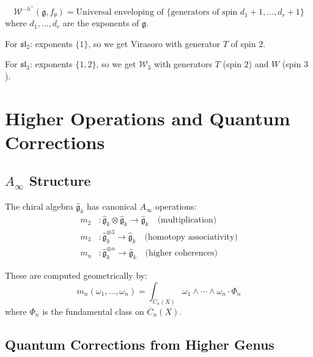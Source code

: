 \begin{theorem}
\begin{equation}
\mathcal{W}^{-h^\vee}(\mathfrak{g}, f_{\theta}) = \text{Universal enveloping of } \{\text{generators of spin } d_1+1, \ldots, d_r+1\}
\end{equation}
where $d_1, \ldots, d_r$ are the exponents of $\mathfrak{g}$.

For $\mathfrak{sl}_2$: exponents $\{1\}$, so we get Virasoro with generator $T$ of spin $2$.

For $\mathfrak{sl}_3$: exponents $\{1,2\}$, so we get $\mathcal{W}_3$ with generators $T$ (spin $2$) and $W$ (spin $3$).
\end{theorem}

\section{Higher Operations and Quantum Corrections}

\subsection{$A_\infty$ Structure}

\begin{theorem}\label{thm:kac-moody-ainfty}
The chiral algebra $\widehat{\mathfrak{g}}_k$ has canonical $A_\infty$ operations:
\begin{align}
m_2 &: \widehat{\mathfrak{g}}_k \otimes \widehat{\mathfrak{g}}_k \to \widehat{\mathfrak{g}}_k \quad \text{(multiplication)} \\
m_3 &: \widehat{\mathfrak{g}}_k^{\otimes 3} \to \widehat{\mathfrak{g}}_k \quad \text{(homotopy associativity)} \\
m_n &: \widehat{\mathfrak{g}}_k^{\otimes n} \to \widehat{\mathfrak{g}}_k \quad \text{(higher coherences)}
\end{align}

These are computed geometrically by:
\begin{equation}
m_n(\omega_1, \ldots, \omega_n) = \int_{\overline{C}_n(X)} \omega_1 \wedge \cdots \wedge \omega_n \cdot \Phi_n
\end{equation}
where $\Phi_n$ is the fundamental class on $\overline{C}_n(X)$.
\end{theorem}

\subsection{Quantum Corrections from Higher Genus}

